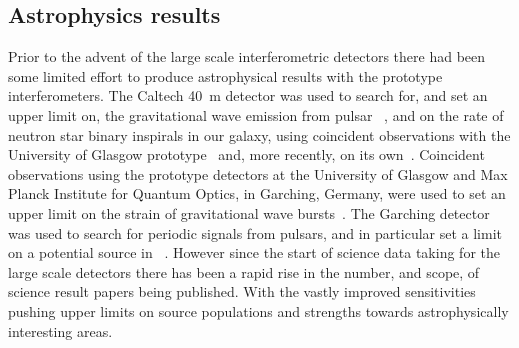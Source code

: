 \documentclass{article}
\begin{document}


\subsection{Astrophysics results}
\label{subsection:results}

Prior to the advent of the large scale interferometric detectors there had been
some limited effort to produce astrophysical results with the prototype
interferometers. The Caltech 40~m detector was used to search for, and set an
upper limit on, the gravitational wave emission from pulsar
~\cite{Hereld:1984}, and on the rate of neutron star
binary inspirals in our galaxy, using coincident observations with the
University of Glasgow prototype~\cite{Smith:1988} and, more recently,
on its own~\cite{Allen:1999}. Coincident observations using the
prototype detectors at the University of Glasgow and Max Planck
Institute for Quantum Optics, in Garching, Germany, were used to set
an upper limit on the strain of gravitational wave bursts~\cite{Nicholson:1996}.
The Garching detector was used to search for periodic signals from pulsars, and
in particular set a limit on a potential source in
~\cite{Niebauer:1993}. However since the start
of science data taking for the large scale detectors there has been a
rapid rise in the number, and scope, of science result papers being
published. With the vastly improved sensitivities pushing upper limits
on source populations and strengths towards astrophysically interesting areas.
\end{document}
